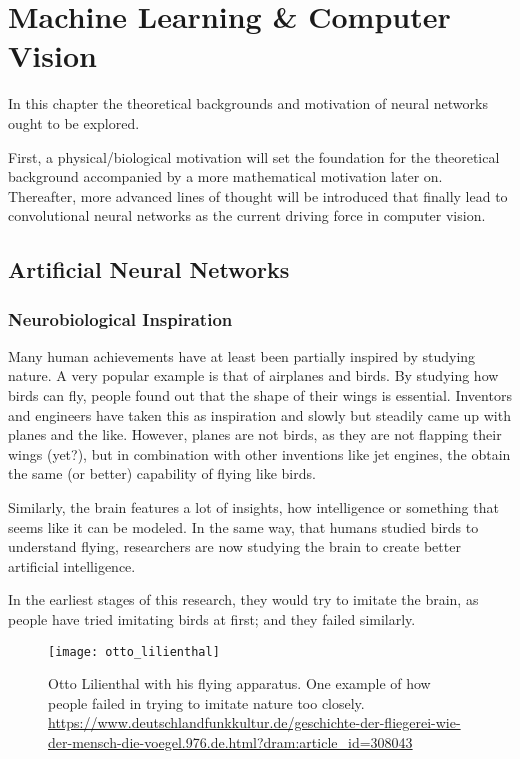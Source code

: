 \setchapterpreamble[u]{\margintoc}
\chapter{Machine Learning \& Computer Vision}
In this chapter the theoretical backgrounds and motivation of neural networks ought to be explored.

First, a physical/biological motivation will set the foundation for the theoretical background accompanied by a more mathematical motivation later on.
Thereafter, more advanced lines of thought will be introduced that finally lead to convolutional neural networks as the current driving force in computer vision.

\section{Artificial Neural Networks}

\subsection[Inspiration]{Neurobiological Inspiration}

Many human achievements have at least been partially inspired by studying nature.
A very popular example is that of airplanes and birds.
By studying how birds can fly, people found out that the shape of their wings is essential.
Inventors and engineers have taken this as inspiration and slowly but steadily came up with planes and the like.
However, planes are not birds, as they are not flapping their wings (yet?), but in combination with other inventions like jet engines, the obtain the same (or better) capability of flying like birds.

Similarly, the brain features a lot of insights, how intelligence or something that seems like it can be modeled.
In the same way, that humans studied birds to understand flying, researchers are now studying the brain to create better artificial intelligence.

In the earliest stages of this research, they would try to imitate the brain, as people have tried imitating birds at first; and they failed similarly.
\begin{figure}
    \texttt{[image: otto\_lilienthal]}
    \caption[]{Otto Lilienthal with his flying apparatus. One example of how people failed in trying to imitate nature too closely. \url{https://www.deutschlandfunkkultur.de/geschichte-der-fliegerei-wie-der-mensch-die-voegel.976.de.html?dram:article_id=308043}}
\end{figure}

